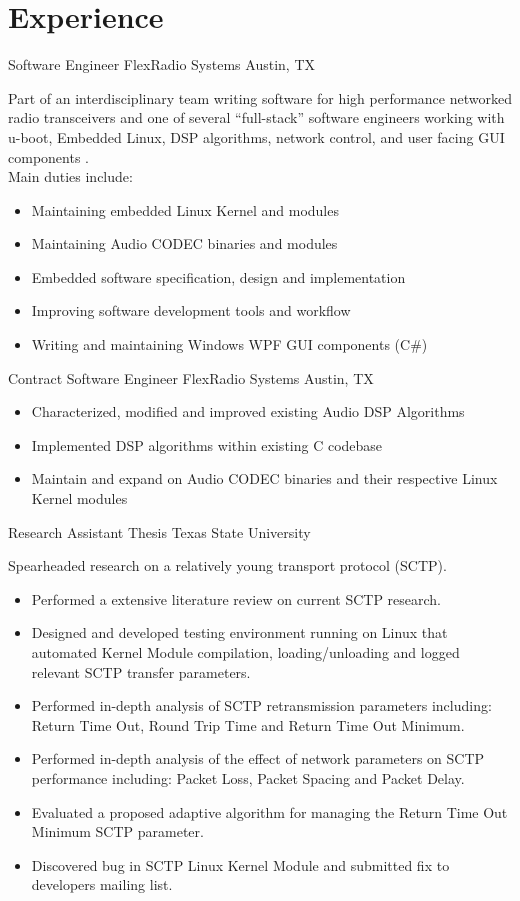 \documentclass[11p,letterpaper,sans]{moderncv}
\begin{document}
\section{Experience}

{Software Engineer}
{FlexRadio Systems}
{Austin, TX}
{}
{
Part of an interdisciplinary team writing software for high performance networked radio transceivers and one of several ``full-stack'' software engineers working with u-boot, Embedded Linux, DSP algorithms, network control, and user facing GUI components \cite{DCCPaper}.\\
Main duties include:
\begin{itemize}
\item Maintaining embedded Linux Kernel and modules
\item Maintaining Audio CODEC binaries and modules
\item Embedded software specification, design and implementation 
\item Improving software development tools and workflow
\item Writing and maintaining Windows WPF GUI components (C\#)
\end{itemize}
}

{Contract Software Engineer}
{FlexRadio Systems}
{Austin, TX}
{}
{
\begin{itemize}
\item Characterized, modified and improved existing Audio DSP Algorithms
\item Implemented DSP algorithms within existing C codebase
\item Maintain and expand on Audio CODEC binaries and their respective Linux Kernel modules
\end{itemize}
}

{Research Assistant}
{Thesis}
{Texas State University}
{}
{
Spearheaded research on a relatively young transport
  protocol (SCTP).
\begin{itemize}
\item Performed a extensive literature review on current SCTP
  research.
\item Designed and developed testing environment running on Linux that
  automated Kernel Module compilation, loading/unloading and logged
  relevant SCTP transfer parameters.
\item Performed in-depth analysis of SCTP retransmission parameters
  including: Return Time Out, Round Trip Time and Return Time Out
  Minimum.
\item Performed in-depth analysis of the effect of network parameters
  on SCTP performance including: Packet Loss, Packet Spacing and
  Packet Delay.
\item Evaluated a proposed adaptive algorithm for managing the Return
  Time Out Minimum SCTP parameter.
\item Discovered bug in SCTP Linux Kernel Module and submitted fix to
  developers mailing list.
\end{itemize}
}
\end{document}
